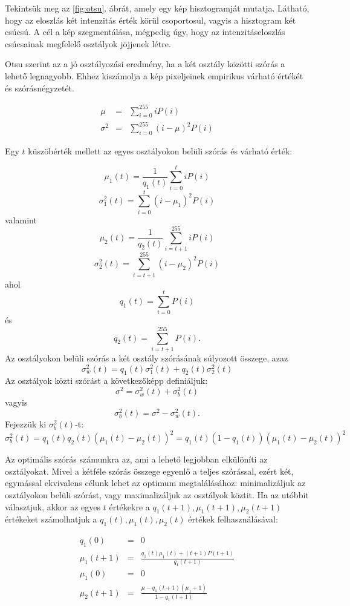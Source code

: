 \documentclass[a4paper,12pt]{article}
\begin{document}
Tekintsük meg az \ref{fig:otsu}. ábrát, amely egy kép hisztogramját
mutatja. Látható, hogy az eloszlás két intenzitás érték körül csoportosul,
vagyis a hisztogram két csúcsú. A cél a kép szegmentálása, mégpedig úgy, hogy az
intenzitáseloszlás csúcsainak megfelelő osztályok jöjjenek létre.

Otsu szerint az a jó osztályozási eredmény, ha a két osztály közötti szórás a
lehető legnagyobb. Ehhez kiszámolja a kép pixeljeinek empirikus várható értékét
és szórásnégyzetét.

\begin{eqnarray*}
	\mu & = & \sum_{i=0}^{255} i P(i)\\
	\sigma^2 & = & \sum_{i=0}^{255} (i-\mu)^2 P(i)
\end{eqnarray*}



Egy $t$ küszöbérték mellett az egyes osztályokon belüli szórás és várható érték:

$$\mu_1(t) =\frac{1}{q_1(t)}\sum_{i=0}^{t} i P(i)$$
$$\sigma^2_1(t)=\sum_{i=0}^{t} (i-\mu_1)^2 P(i)$$
valamint
$$\mu_2(t) =\frac{1}{q_2(t)}\sum_{i=t+1}^{255} i P(i)$$
$$\sigma^2_2(t)=\sum_{i=t+1}^{255} (i-\mu_2)^2 P(i)$$
ahol 
$$q_1(t)=\sum_{i=0}^{t} P(i)$$
és
$$q_2(t)=\sum_{i=t+1}^{255} P(i).$$
Az osztályokon belüli szórás a két osztály szórásának súlyozott összege, azaz
$$\sigma_w^2(t)=q_1(t) \sigma^2_1(t) + q_2(t) \sigma_2^2(t)$$
Az osztályok közti szórást a következőképp definiáljuk:
$$\sigma^2=\sigma^2_w(t)+\sigma_b^2(t)$$
vagyis 
$$\sigma_b^2(t)=\sigma^2-\sigma_w^2(t).$$
Fejezzük ki $\sigma_b^2(t)$-t:
$$\sigma_b^2(t)=q_1(t)q_2(t) \left( \mu_1(t)-\mu_2(t) \right)^2=q_1(t)
(1-q_1(t))(\mu_1(t)-\mu_2(t))^2$$

Az optimális szórás számunkra az, ami a lehető legjobban elkülöníti az
osztályokat. Mivel a kétféle szórás összege egyenlő a teljes szórással, ezért
két, egymással ekvivalens célunk lehet az optimum megtalálásához: minimalizáljuk
az osztályokon belüli szórást, vagy maximalizáljuk az osztályok köztit. Ha az
utóbbit választjuk, akkor az egyes $t$ értékekre a $q_1(t+1), \mu_1(t+1),
\mu_2(t+1)$ értékeket számolhatjuk a $q_1(t), \mu_1(t), \mu_2(t)$ értékek
felhasználásával:

\begin{eqnarray*}
	q_1(0) & = & 0\\
	\mu_1(t+1) & = & \frac{q_1(t)\mu_1(t)+(t+1)P(t+1)}{q_1(t+1)}\\
	\mu_1(0) & = & 0\\
	\mu_2(t+1) & = & \frac{\mu-q_1(t+1)(\mu_1+1)}{1-q_1(t+1)}\\
\end{eqnarray*}
\end{document}
